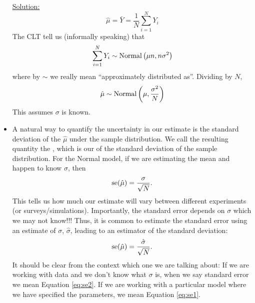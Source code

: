 \begin{itemize}
\begin{example}
\noindent
\underline{Solution:}
\begin{equation*}
\hat{\mu} = \bar{Y} = \frac{1}{N}\sum_{i=1}^NY_i
\end{equation*}
The CLT tell us (informally speaking) that 
\begin{equation*}
\sum_{i=1}^NY_i \sim {\rm Normal}\left(\mu n,n\sigma^2 \right)
\end{equation*}
where by $\sim$ we really mean ``approximately distributed as''. Dividing by $N$, 
\begin{equation*}
\hat{\mu} \sim {\rm Normal}\left(\mu ,\frac{\sigma^2}{N} \right)
\end{equation*}
This assumes $\sigma$ is known.

\end{example} 

\item A natural way to quantify the uncertainty in our estimate is the standard deviation of the $\hat{\mu}$ under the sample distribution.  We call the resulting quantity the , which is our  of the standard deviation of the sample distribution.  For the Normal model, if we are estimating the mean and happen to know $\sigma$, then 
\begin{equation}\label{eq:se1}
{\rm se}(\hat{\mu}) =  \frac{\sigma}{\sqrt{N}}. 
\end{equation}
This tells us how much our estimate will vary between different experiments (or surveys/simulations). 
Importantly, the standard error depends on $\sigma$ which we may not know!!! Thus, it is common to estimate the standard error using an estimate of $\sigma$, $\hat{\sigma}$, leading to an estimator of the standard deviation:
\begin{equation}\label{eq:se2}
{\rm se}(\hat{\mu}) =  \frac{\hat{\sigma}}{\sqrt{N}}. 
\end{equation}
It should be clear from the context which one we are talking about: If we are working with data and we don't know what $\sigma$ is, when we say standard error we mean Equation \ref{eq:se2}. If we are working with a particular model where we have specified the parameters, we mean Equation \ref{eq:se1}. 
\end{itemize}



